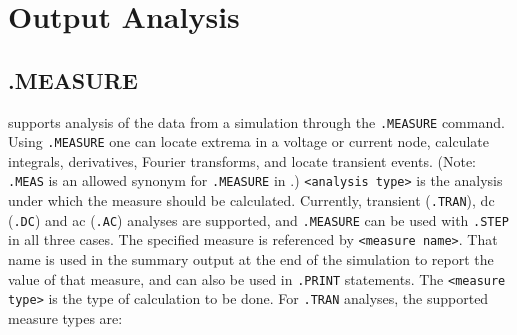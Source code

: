 \section{Output Analysis}
\label{Output_Analysis}

\subsection{.MEASURE}
 
\Xyce{} supports analysis of the data from a simulation through the
\texttt{.MEASURE} command.  Using \texttt{.MEASURE} one can locate extrema in a
voltage or current node, calculate integrals, derivatives, Fourier transforms,
and locate transient events. (Note: \texttt{.MEAS} is an allowed synonym for 
\texttt{.MEASURE} in \Xyce{}.)
\texttt{<analysis type>} is the analysis under which the measure should be calculated.  
Currently,  transient (\texttt{.TRAN}), dc (\texttt{.DC}) and ac (\texttt{.AC}) analyses 
are supported, and \texttt{.MEASURE} can be used with \texttt{.STEP} in all three cases. 
The specified measure is referenced by \texttt{<measure name>}.  That name is used 
in the summary output at the end of the simulation to report the value of that
measure, and can also be used in \texttt{.PRINT} statements.  The
\texttt{<measure type>} is the type of calculation to be done.  For \texttt{.TRAN}
analyses, the supported measure types are:
